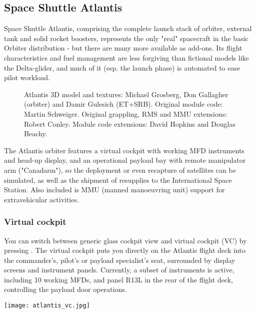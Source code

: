 \documentclass[Orbiter User Manual.tex]{subfiles}
\begin{document}
\subsection{Space Shuttle Atlantis}
\label{ssec:atlantis}
Space Shuttle Atlantis, comprising the complete launch stack of orbiter, external tank and solid rocket boosters, represents the only "real" spacecraft in the basic Orbiter distribution - but there are many more available as add-ons. Its flight characteristics and fuel management are less forgiving than fictional models like the Delta-glider, and much of it (esp. the launch phase) is automated to ease pilot workload.


\begin{figure}[H]
	\centering
	\caption{Atlantis 3D model and textures: Michael Grosberg, Don Gallagher (orbiter) and Damir Gulesich (ET+SRB). Original module code: Martin Schweiger. Original grappling, RMS and MMU extensions: Robert Conley. Module code extensions: David Hopkins and Douglas Beachy.}
\end{figure}

\noindent
The Atlantis orbiter features a virtual cockpit with working MFD instruments and head-up display, and an operational payload bay with remote manipulator arm ("Canadarm"), so the deployment or even recapture of satellites can be simulated, as well as the shipment of resupplies to the International Space Station. Also included is MMU (manned manoeuvring unit) support for extravehicular activities.


\subsubsection{Virtual cockpit}
You can switch between generic glass cockpit view and virtual cockpit (VC) by pressing . The virtual cockpit puts you directly on the Atlantis flight deck into the commander's, pilot's or payload specialist's seat, surrounded by display screens and instrument panels. Currently, a subset of instruments is active, including 10 working MFDs, and panel R13L in the rear of the flight deck, controlling the payload door operations.

\begin{center}
\texttt{[image: atlantis\_vc.jpg]}
\end{center}
\end{document}
